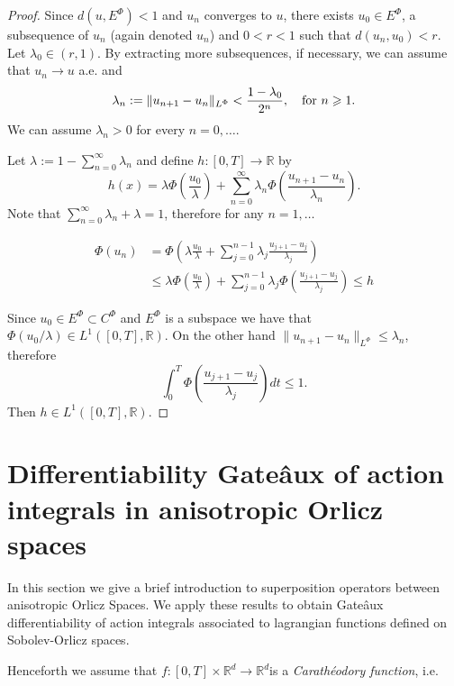 \documentclass[twoside]{article}
\theoremstyle{remark}
\newcommand{\orlnor}{\|_{L^{\Phi}}}
\newcommand{\ephi}{E^{\Phi}}
\newcommand{\claseor}{C^{\Phi}}
\newcommand{\rr}{\mathbb{R}}
\renewcommand{\leq}{\leqslant}
\renewcommand{\geq}{\geqslant}
\begin{document}
\begin{proof}
Since $d({u},\ephi)<1$ and ${u}_n$ converges to ${u}$, there exists $u_0\in\ephi$, a subsequence of $u_n$ (again denoted $u_n$) and $0<r<1$  such that $d(u_n,u_0)<r$. Let $\lambda_0\in (r,1)$.  By extracting more subsequences, if necessary, we can assume that $u_n\to u$ a.e. and
\[\lambda_n:=\|{u}_{n+1}-{u}_{n}\orlnor<\frac{1-\lambda_0}{2^n},\quad\hbox{for } n\geq 1.\]
We can assume $\lambda_n>0$ for every $n=0,\ldots$.

Let $\lambda:=1-\sum_{n=0}^{\infty}\lambda_n$ and define $h:[0,T]\rightarrow\mathbb{R}$  by
\begin{equation}\label{eq:serie} h(x)= \lambda\Phi\left(\frac{u_0}{\lambda}\right)+\sum_{n=0}^{\infty}\lambda_n\Phi\left(\frac{u_{n+1}-u_n}{\lambda_n}\right).
\end{equation}
Note that $\sum_{n=0}^{\infty}\lambda_n+\lambda=1$, therefore for any $n=1,\ldots$


\[
 \begin{split}
   \Phi(u_n) &=\Phi\left(  \lambda\frac{u_0}{\lambda}+   \sum_{j=0}^{n-1}\lambda_j\frac{u_{j+1}-u_j}{\lambda_j} \right)\\
   &\leq
   \lambda\Phi\left(\frac{u_0}{\lambda}\right)+\sum_{j=0}^{n-1}\lambda_j\Phi\left(\frac{u_{j+1}-u_j}{\lambda_j}\right) \leq h
 \end{split}
\]

Since $u_0\in\ephi\subset \claseor$ and $\ephi$ is a subspace we have that $\Phi(u_0/\lambda)\in L^1([0,T],\rr)$. 
On the other hand $\|u_{n+1}-u_n\orlnor \leq \lambda_n$, therefore
\[
 \int_0^T\Phi\left(\frac{u_{j+1}-u_j}{\lambda_j}\right)dt\leq 1.
\]
Then $h\in L^1([0,T],\rr)$.


\end{proof}




\section{Differentiability Gate\^aux of action integrals in anisotropic Orlicz spaces}
In this section we give a brief introduction to superposition operators between anisotropic Orlicz Spaces.  
We apply these results to obtain Gate\^aux differentiability of                                                                                action integrals associated to lagrangian functions defined on Sobolev-Orlicz spaces.

Henceforth we assume that  $f:[0,T]\times \rr^d\to\rr^d$is a \emph{Carath\'eodory function}, i.e.
\end{document}
